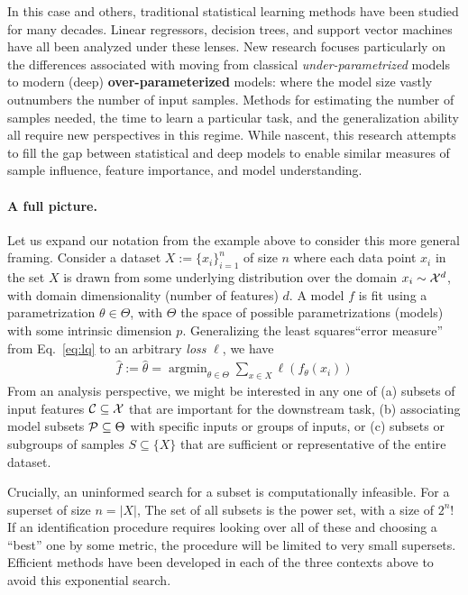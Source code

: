 In this case and others, traditional statistical learning methods 
have been studied 
for many decades.
Linear regressors, decision trees, and support vector machines
have all been analyzed under these lenses.
New research focuses
particularly on the differences
associated with moving from classical \textit{under-parametrized} models to
modern (deep) \textbf{over-parameterized} models: where
the model size vastly outnumbers the number
of input samples.
Methods for estimating the number of samples needed,
the time to learn a particular task,
and the generalization ability 
all require new perspectives in this regime.
While nascent, this research
attempts to fill the gap between
statistical and deep models to enable similar measures of sample influence, feature importance, and model understanding. 

\paragraph{A full picture.}
Let us expand our notation from the example above to consider this more general framing.
Consider a dataset $X:=\{x_i\}_{i=1}^n$ of size $n$ where each data point $x_i$ in the set $X$ is drawn from some underlying distribution over the domain $x_i \sim \mathcal{X}^d$, 
with domain dimensionality (number of features) $d$.
A model $f$ is fit using a parametrization $\theta \in \Theta$,
with $\Theta$ the space of possible parametrizations (models) with some intrinsic dimension $p$. 
Generalizing the least squares``error measure'' from Eq.~\eqref{eq:lq} to an arbitrary \textit{loss} $\ell$, we have
\begin{align}\label{eq:learning}
    \hat{f}:=\hat{\theta} = \mathop{\arg\min}_{\theta\in\Theta} \sum_{x \in X} \ell(f_\theta(x_i))
\end{align}
From an analysis perspective, 
we might be interested in any one of 
(a) subsets of input features $\mathcal{C} \subseteq \mathcal{X}$ that are important for the downstream task,
(b) associating model subsets $\mathcal{P} \subseteq \Theta$ with specific inputs or groups of inputs, or 
(c) subsets or subgroups of samples $S \subseteq \{X\}$ that are sufficient or representative of the entire dataset.

Crucially, an uninformed search for a subset is computationally infeasible. For a superset of size $n=|X|$, The set of all subsets is the power set, with a size of $2^{n}$! If an identification procedure requires looking over all of these and choosing a ``best'' one by some metric, the procedure will be limited to very small supersets.
Efficient methods have been developed in each of the three contexts above to avoid this exponential search.

